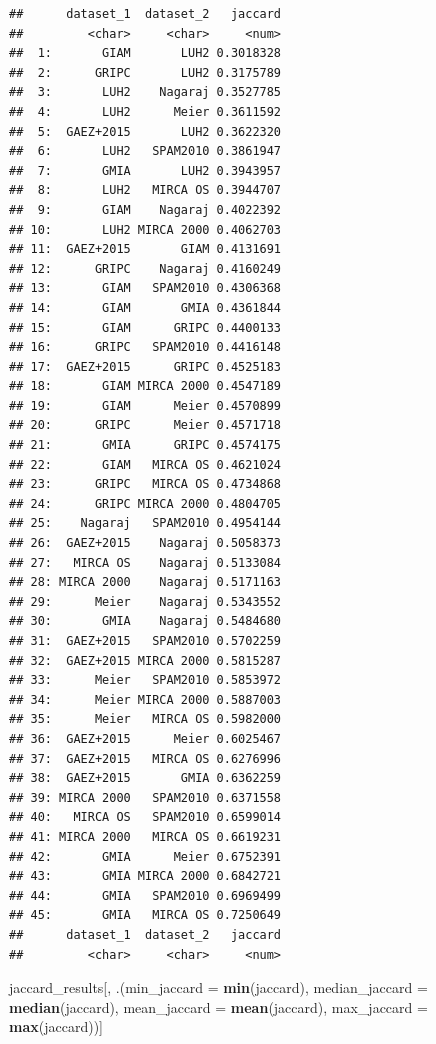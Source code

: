\documentclass[
  11pt,
]{article}
\newenvironment{Shaded}{\begin{snugshade}}{\end{snugshade}}
\newcommand{\AttributeTok}[1]{\textcolor[rgb]{0.13,0.29,0.53}{#1}}
\newcommand{\FunctionTok}[1]{\textcolor[rgb]{0.13,0.29,0.53}{\textbf{#1}}}
\newcommand{\NormalTok}[1]{#1}
\begin{document}
\begin{verbatim}
##      dataset_1  dataset_2   jaccard
##         <char>     <char>     <num>
##  1:       GIAM       LUH2 0.3018328
##  2:      GRIPC       LUH2 0.3175789
##  3:       LUH2    Nagaraj 0.3527785
##  4:       LUH2      Meier 0.3611592
##  5:  GAEZ+2015       LUH2 0.3622320
##  6:       LUH2   SPAM2010 0.3861947
##  7:       GMIA       LUH2 0.3943957
##  8:       LUH2   MIRCA OS 0.3944707
##  9:       GIAM    Nagaraj 0.4022392
## 10:       LUH2 MIRCA 2000 0.4062703
## 11:  GAEZ+2015       GIAM 0.4131691
## 12:      GRIPC    Nagaraj 0.4160249
## 13:       GIAM   SPAM2010 0.4306368
## 14:       GIAM       GMIA 0.4361844
## 15:       GIAM      GRIPC 0.4400133
## 16:      GRIPC   SPAM2010 0.4416148
## 17:  GAEZ+2015      GRIPC 0.4525183
## 18:       GIAM MIRCA 2000 0.4547189
## 19:       GIAM      Meier 0.4570899
## 20:      GRIPC      Meier 0.4571718
## 21:       GMIA      GRIPC 0.4574175
## 22:       GIAM   MIRCA OS 0.4621024
## 23:      GRIPC   MIRCA OS 0.4734868
## 24:      GRIPC MIRCA 2000 0.4804705
## 25:    Nagaraj   SPAM2010 0.4954144
## 26:  GAEZ+2015    Nagaraj 0.5058373
## 27:   MIRCA OS    Nagaraj 0.5133084
## 28: MIRCA 2000    Nagaraj 0.5171163
## 29:      Meier    Nagaraj 0.5343552
## 30:       GMIA    Nagaraj 0.5484680
## 31:  GAEZ+2015   SPAM2010 0.5702259
## 32:  GAEZ+2015 MIRCA 2000 0.5815287
## 33:      Meier   SPAM2010 0.5853972
## 34:      Meier MIRCA 2000 0.5887003
## 35:      Meier   MIRCA OS 0.5982000
## 36:  GAEZ+2015      Meier 0.6025467
## 37:  GAEZ+2015   MIRCA OS 0.6276996
## 38:  GAEZ+2015       GMIA 0.6362259
## 39: MIRCA 2000   SPAM2010 0.6371558
## 40:   MIRCA OS   SPAM2010 0.6599014
## 41: MIRCA 2000   MIRCA OS 0.6619231
## 42:       GMIA      Meier 0.6752391
## 43:       GMIA MIRCA 2000 0.6842721
## 44:       GMIA   SPAM2010 0.6969499
## 45:       GMIA   MIRCA OS 0.7250649
##      dataset_1  dataset_2   jaccard
##         <char>     <char>     <num>
\end{verbatim}

\begin{Shaded}
\begin{Highlighting}[]
\NormalTok{jaccard\_results[, .(}\AttributeTok{min\_jaccard =} \FunctionTok{min}\NormalTok{(jaccard),}
                    \AttributeTok{median\_jaccard =} \FunctionTok{median}\NormalTok{(jaccard),}
                    \AttributeTok{mean\_jaccard =} \FunctionTok{mean}\NormalTok{(jaccard),}
                    \AttributeTok{max\_jaccard =} \FunctionTok{max}\NormalTok{(jaccard))]}
\end{Highlighting}
\end{Shaded}
\end{document}
